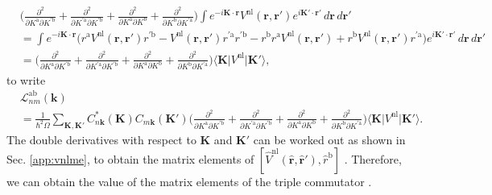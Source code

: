 \begin{align}\label{3.4}
&\Big(
 \frac{\partial^{2}}{\partial K^\mathrm{a}\partial K^{\prime\mathrm{b}}}
+\frac{\partial^{2}}{\partial K^{\prime\mathrm{a}}\partial K^{\prime\mathrm{b}}}
+\frac{\partial^{2}}{\partial K^\mathrm{a}\partial K^\mathrm{b}}
+\frac{\partial^{2}}{\partial K^\mathrm{b}\partial K^{\prime\mathrm{a}}}
\Big)
\int
e^{-i\mathbf{K}\cdot\mathbf{r}}
V^\mathrm{nl}(\mathbf{r},\mathbf{r}')
e^{i\mathbf{K}'\cdot\mathbf{r}'}
\,d\mathbf{r}\,d\mathbf{r}'\nonumber\\
&= \int e^{-i\mathbf{K}\cdot\mathbf{r}}
\Big( 
  r^{\mathrm{a}}V^\mathrm{nl}(\mathbf{r},\mathbf{r}')r^{\prime\mathrm{b}}
- V^\mathrm{nl}(\mathbf{r},\mathbf{r}')r^{\prime\mathrm{a}}r^{\prime\mathrm{b}}
- r^\mathrm{b}r^{\mathrm{a}}V^\mathrm{nl}(\mathbf{r},\mathbf{r}')
+ r^\mathrm{b}V^\mathrm{nl}(\mathbf{r},\mathbf{r}')r^{\prime\mathrm{a}}
\Big)  
e^{i\mathbf{K}'\cdot\mathbf{r}'}\,d\mathbf{r}\,d\mathbf{r}'\nonumber\\
&= \Big(
 \frac{\partial^{2}}{\partial K^\mathrm{a}\partial K^{\prime\mathrm{b}}}
+\frac{\partial^{2}}{\partial K^{\prime\mathrm{a}}\partial K^{\prime\mathrm{b}}}
+\frac{\partial^{2}}{\partial K^\mathrm{a}\partial K^\mathrm{b}}
+\frac{\partial^{2}}{\partial K^\mathrm{b}\partial K^{\prime\mathrm{a}}}
\Big)
\langle\mathbf{K}\vert V^\mathrm{nl} \vert\mathbf{K}'\rangle,
\end{align}
to write
\begin{align}\label{3.7}
&\mathcal{L}^{\mathrm{ab}}_{nm}(\mathbf{k})\\
&= \frac{1}{\hbar^{2}\Omega}
\sum_{\mathbf{K},\mathbf{K}'} 
C^{*}_{n\mathbf{k}}(\mathbf{K})C_{m\mathbf{k}}(\mathbf{K}')
\Big(
 \frac{\partial^{2}}{\partial K^\mathrm{a}\partial K^{\prime\mathrm{b}}}
+\frac{\partial^{2}}{\partial K^{\prime\mathrm{a}}\partial K^{\prime\mathrm{b}}}
+\frac{\partial^{2}}{\partial K^\mathrm{a}\partial K^\mathrm{b}}
+\frac{\partial^{2}}{\partial K^\mathrm{b}\partial K^{\prime\mathrm{a}}}
\Big)
\langle\mathbf{K}\vert V^\mathrm{nl} \vert\mathbf{K}'\rangle.
\end{align} 
The double derivatives with respect to $\mathbf{K}$ and $\mathbf{K}'$ can be
worked out as shown in Sec. \ref{app:vnlme}, to obtain the matrix elements of
$[\hat{V}^\mathrm{nl}(\hat{\mathbf{r}},\hat{\mathbf{r}}'),\hat{r}^\mathrm{b}]$
\cite{olevano}. Therefore, we can obtain the value of the matrix elements of the
triple commutator \cite{valerie}.

